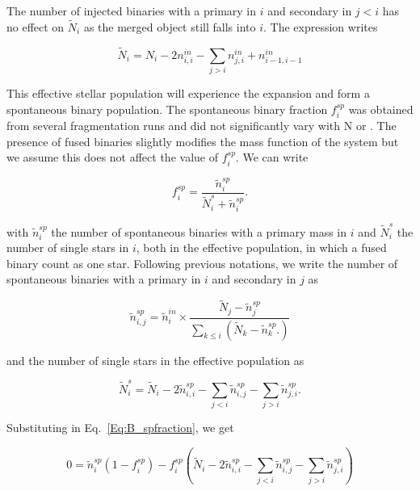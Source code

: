 The number of injected binaries with a primary in $i$ and secondary in $j<i$ has no effect on $\tilde{N}_i$ as the merged object still falls into $i$. The expression writes

\begin{equation}
\tilde{N}_i = N_i - 2  n_{i,i}^{in} - \sum\limits_{j>i} n_{j,i}^{in} + n_{i-1,i-1}^{in}
\end{equation}


This effective stellar population will experience the \HubLem expansion and form a spontaneous binary population. The spontaneous binary fraction $f_i^{sp}$ was obtained from several \HubLem fragmentation runs and did not significantly vary with N or \tHub. The presence of fused binaries slightly modifies the mass function of the system but we assume this does not affect the value of $f_i^{sp}$. We can write

\begin{equation}
\label{Eq:B_spfraction}
f_i^{sp} = \frac{\tilde{n}_i^{sp}}{\tilde{N}_i^{s} + \tilde{n}_i^{sp}}.
\end{equation}

with $\tilde{n}_i^{sp}$ the number of spontaneous binaries with a primary mass in $i$ and $\tilde{N}_i^{s}$ the number of single stars in $i$, both in the effective population, in which a fused binary count as one star. Following previous notations, we write the number of spontaneous binaries with a primary in $i$ and secondary in $j$ as

\begin{equation}
\tilde{n}_{i,j}^{sp} = \tilde{n}_i^{in} \times \frac{\tilde{N}_j - \tilde{n}_j^{sp} }{\sum\limits_{k\le i} \left( \tilde{N}_k - \tilde{n}_k^{sp}. \right) }
\end{equation}

and the number of single stars in the effective population as

\begin{equation}
\tilde{N}_i^{s} = \tilde{N}_i - 2  \tilde{n}_{i,i}^{sp} - \sum\limits_{j<i} \tilde{n}_{i,j}^{sp} - \sum\limits_{j>i} \tilde{n}_{j,i}^{sp}.
\end{equation}


Substituting in Eq.~\ref{Eq:B_spfraction}, we get


\begin{equation}
\label{Eq:B_spontaneous}
0 =  \tilde{n}_i^{sp} \left( 1 - f_i^{sp}\right) - f_i^{sp}\left( \tilde{N}_i - 2  \tilde{n}_{i,i}^{sp} - \sum\limits_{j<i} \tilde{n}_{i,j}^{sp} - \sum\limits_{j>i} \tilde{n}_{j,i}^{sp} \right)
\end{equation}

